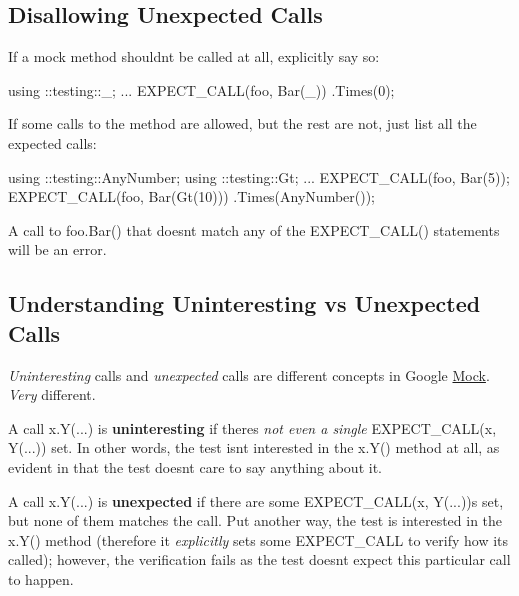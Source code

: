 \subsection*{Disallowing Unexpected Calls}

If a mock method shouldn\textquotesingle{}t be called at all, explicitly say so\+:


\begin{DoxyCode}
using ::testing::\_;
...
  EXPECT\_CALL(foo, Bar(\_))
      .Times(0);
\end{DoxyCode}


If some calls to the method are allowed, but the rest are not, just list all the expected calls\+:


\begin{DoxyCode}
using ::testing::AnyNumber;
using ::testing::Gt;
...
  EXPECT\_CALL(foo, Bar(5));
  EXPECT\_CALL(foo, Bar(Gt(10)))
      .Times(AnyNumber());
\end{DoxyCode}


A call to {\ttfamily foo.\+Bar()} that doesn\textquotesingle{}t match any of the {\ttfamily E\+X\+P\+E\+C\+T\+\_\+\+C\+A\+L\+L()} statements will be an error.

\subsection*{Understanding Uninteresting vs Unexpected Calls}

{\itshape Uninteresting} calls and {\itshape unexpected} calls are different concepts in Google \hyperlink{classMock}{Mock}. {\itshape Very} different.

A call {\ttfamily x.\+Y(...)} is {\bfseries uninteresting} if there\textquotesingle{}s {\itshape not even a single} {\ttfamily E\+X\+P\+E\+C\+T\+\_\+\+C\+A\+LL(x, Y(...))} set. In other words, the test isn\textquotesingle{}t interested in the {\ttfamily x.\+Y()} method at all, as evident in that the test doesn\textquotesingle{}t care to say anything about it.

A call {\ttfamily x.\+Y(...)} is {\bfseries unexpected} if there are some {\ttfamily E\+X\+P\+E\+C\+T\+\_\+\+C\+A\+LL(x, Y(...))s} set, but none of them matches the call. Put another way, the test is interested in the {\ttfamily x.\+Y()} method (therefore it {\itshape explicitly} sets some {\ttfamily E\+X\+P\+E\+C\+T\+\_\+\+C\+A\+LL} to verify how it\textquotesingle{}s called); however, the verification fails as the test doesn\textquotesingle{}t expect this particular call to happen.

